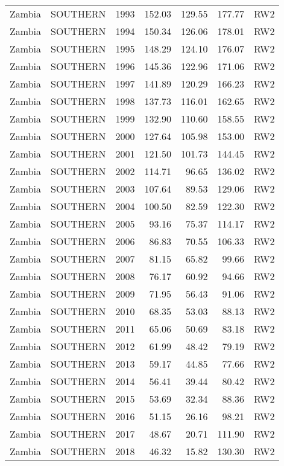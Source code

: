\begin{longtable}{lllrrrl}
  Zambia & SOUTHERN & 1993 & 152.03 & 129.55 & 177.77 & RW2 \\ 
  Zambia & SOUTHERN & 1994 & 150.34 & 126.06 & 178.01 & RW2 \\ 
  Zambia & SOUTHERN & 1995 & 148.29 & 124.10 & 176.07 & RW2 \\ 
  Zambia & SOUTHERN & 1996 & 145.36 & 122.96 & 171.06 & RW2 \\ 
  Zambia & SOUTHERN & 1997 & 141.89 & 120.29 & 166.23 & RW2 \\ 
  Zambia & SOUTHERN & 1998 & 137.73 & 116.01 & 162.65 & RW2 \\ 
  Zambia & SOUTHERN & 1999 & 132.90 & 110.60 & 158.55 & RW2 \\ 
  Zambia & SOUTHERN & 2000 & 127.64 & 105.98 & 153.00 & RW2 \\ 
  Zambia & SOUTHERN & 2001 & 121.50 & 101.73 & 144.45 & RW2 \\ 
  Zambia & SOUTHERN & 2002 & 114.71 & 96.65 & 136.02 & RW2 \\ 
  Zambia & SOUTHERN & 2003 & 107.64 & 89.53 & 129.06 & RW2 \\ 
  Zambia & SOUTHERN & 2004 & 100.50 & 82.59 & 122.30 & RW2 \\ 
  Zambia & SOUTHERN & 2005 & 93.16 & 75.37 & 114.17 & RW2 \\ 
  Zambia & SOUTHERN & 2006 & 86.83 & 70.55 & 106.33 & RW2 \\ 
  Zambia & SOUTHERN & 2007 & 81.15 & 65.82 & 99.66 & RW2 \\ 
  Zambia & SOUTHERN & 2008 & 76.17 & 60.92 & 94.66 & RW2 \\ 
  Zambia & SOUTHERN & 2009 & 71.95 & 56.43 & 91.06 & RW2 \\ 
  Zambia & SOUTHERN & 2010 & 68.35 & 53.03 & 88.13 & RW2 \\ 
  Zambia & SOUTHERN & 2011 & 65.06 & 50.69 & 83.18 & RW2 \\ 
  Zambia & SOUTHERN & 2012 & 61.99 & 48.42 & 79.19 & RW2 \\ 
  Zambia & SOUTHERN & 2013 & 59.17 & 44.85 & 77.66 & RW2 \\ 
  Zambia & SOUTHERN & 2014 & 56.41 & 39.44 & 80.42 & RW2 \\ 
  Zambia & SOUTHERN & 2015 & 53.69 & 32.34 & 88.36 & RW2 \\ 
  Zambia & SOUTHERN & 2016 & 51.15 & 26.16 & 98.21 & RW2 \\ 
  Zambia & SOUTHERN & 2017 & 48.67 & 20.71 & 111.90 & RW2 \\ 
  Zambia & SOUTHERN & 2018 & 46.32 & 15.82 & 130.30 & RW2 \\ 

\end{longtable}
